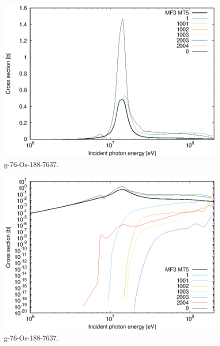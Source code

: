 \begin{figure}
 \includegraphics[width=\linewidth]{eps/g_76-Os-188_7637.eps}
  \caption{g-76-Os-188-7637.}
\end{figure}
\begin{figure}
 \includegraphics[width=\linewidth]{eps-log/g_76-Os-188_7637.eps}
 \caption{g-76-Os-188-7637.}
\end{figure}
\newpage \clearpage

